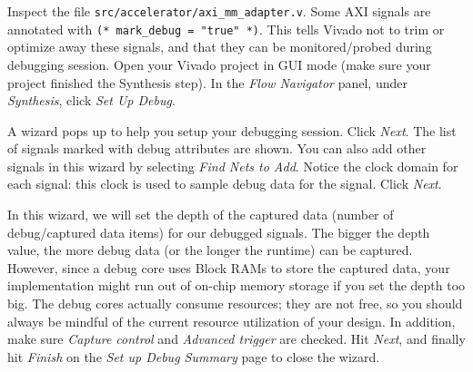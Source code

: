 \documentclass[11pt]{article}
\begin{document}
Inspect the file \verb|src/accelerator/axi_mm_adapter.v|. Some AXI signals are annotated with \verb|(* mark_debug = "true" *)|. This tells Vivado not to trim or optimize away these signals, and that they can be monitored/probed during debugging session. Open your Vivado project in GUI mode (make sure your project finished the Synthesis step). In the \emph{Flow Navigator} panel, under \emph{Synthesis}, click \emph{Set Up Debug}.

\begin{center}
\end{center}

A wizard pops up to help you setup your debugging session. Click \emph{Next}. The list of signals marked with debug attributes are shown. You can also add other signals in this wizard by selecting \emph{Find Nets to Add}. Notice the clock domain for each signal: this clock is used to sample debug data for the signal. Click \emph{Next}.

\begin{center}
\end{center}

In this wizard, we will set the depth of the captured data (number of debug/captured data items) for our debugged signals. The bigger the depth value, the more debug data (or the longer the runtime) can be captured. However, since a debug core uses Block RAMs to store the captured data, your implementation might run out of on-chip memory storage if you set the depth too big. The debug cores actually consume resources; they are not free, so you should always be mindful of the current resource utilization of your design. In addition, make sure \emph{Capture control} and \emph{Advanced trigger} are checked. Hit \emph{Next}, and finally hit \emph{Finish} on the \textit{Set up Debug Summary} page to close the wizard.
\end{document}
